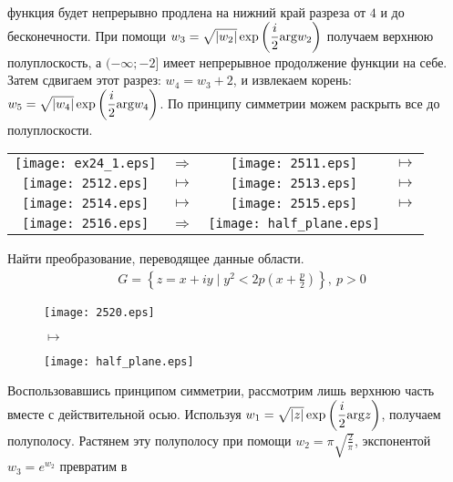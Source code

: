 функция будет непрерывно продлена на нижний край разреза от $4$ и до
бесконечности. При помощи $w_3 = \sqrt{\left| w_2 \right|}\exp \left(
\displaystyle \frac{i}{2}\mathrm{arg} w_2\right)$ получаем верхнюю полуплоскость, а $(-\infty;
-2]$ имеет непрерывное продолжение функции на себе. Затем сдвигаем этот разрез:
$w_4 = w_3+2$, и извлекаем корень: $w_5 = \sqrt{\left| w_4 \right|}\exp \left(
    \displaystyle \frac{i}{2}\mathrm{arg} w_4\right)$. По принципу симметрии можем раскрыть все
до полуплоскости.
\begin{center}
    \begin{tabular}{cccc}
      \texttt{[image: ex24\_1.eps]} & $\Rightarrow$ & \texttt{[image: 2511.eps]} & $\mapsto$ \\
      \texttt{[image: 2512.eps]} & $\mapsto$ & \texttt{[image: 2513.eps]} & $\mapsto$ \\
      \texttt{[image: 2514.eps]} & $\mapsto$ & \texttt{[image: 2515.eps]} & $\mapsto$ \\
      \texttt{[image: 2516.eps]} & $\Rightarrow$ & \texttt{[image: half\_plane.eps]} & \\
    \end{tabular}
\end{center}
\Example
Найти преобразование, переводящее данные области.
\begin{align*}
  & G = \left\{ z = x+iy \mid y^2 < 2p \left( x+\frac{p}{2} \right) \right\}, \ p > 0
\end{align*}
\begin{figure}[h!]
    \begin{minipage}[c]{0.45\textwidth}
        \centering
        \texttt{[image: 2520.eps]}
    \end{minipage}
    \begin{minipage}[c]{0.1\textwidth}
        \centering
        \LARGE{$\mapsto$}
    \end{minipage}
    \begin{minipage}[c]{0.45\textwidth}
        \centering
        \texttt{[image: half\_plane.eps]}
    \end{minipage}
    \label{fig:25.1}
\end{figure}
Воспользовавшись принципом симметрии, рассмотрим лишь верхнюю часть вместе с
действительной осью. Используя $w_1 = \sqrt{\left| z \right|}\exp \left(\displaystyle
    \frac{i}{2}\mathrm{arg} z\right)$, получаем полуполосу. Растянем эту полуполосу при
помощи $w_2 = \pi\sqrt{\frac{2}{\pi}}$, экспонентой $w_3 = e^{w_2}$ превратим в
